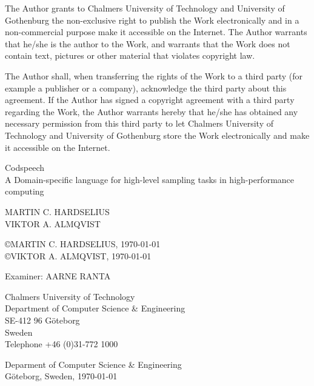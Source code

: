 \thispagestyle{empty}
The Author grants to Chalmers University of Technology and University
of Gothenburg the non-exclusive right to publish the Work
electronically and in a non-commercial purpose make it accessible on
the Internet.  The Author warrants that he/she is the author to the
Work, and warrants that the Work does not contain text, pictures or
other material that violates copyright law.

The Author shall, when transferring the rights of the Work to a third
party (for example a publisher or a company), acknowledge the third
party about this agreement. If the Author has signed a copyright
agreement with a third party regarding the Work, the Author warrants
hereby that he/she has obtained any necessary permission from this
third party to let Chalmers University of Technology and University of
Gothenburg store the Work electronically and make it accessible on the
Internet.

\vfill

\begin{flushleft}
Codspeech\\
A Domain-specific language for high-level sampling tasks in
high-performance computing
\vspace{11pt}

MARTIN C. HARDSELIUS\\
VIKTOR A. ALMQVIST
\vspace{11pt}

\copyright{MARTIN C. HARDSELIUS}, \today \\
\copyright{VIKTOR A. ALMQVIST}, \today
\vspace{11pt}

Examiner: {AARNE RANTA}
\vspace{11pt}

Chalmers University of Technology\\
Department of Computer Science \& Engineering\\
SE-412 96 Göteborg\\
Sweden\\
Telephone +46 (0)31-772 1000
\vspace{66pt}

Deparment of Computer Science \& Engineering\\
Göteborg, Sweden, \today
\end{flushleft}
